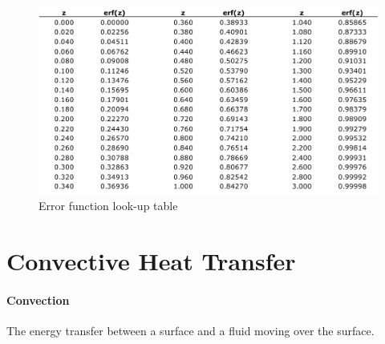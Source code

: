\documentclass[12pt, a4paper]{article}
\begin{document}
\begin{figure}[H]
    \centering
    \includegraphics[width=\textwidth]{img/error_function.pdf}
    \caption{Error function look-up table}
    \label{fig:my_label}
\end{figure}

\newpage
\section{Convective Heat Transfer}
\paragraph{Convection} The energy transfer between a surface and a fluid moving over the surface.
\end{document}
